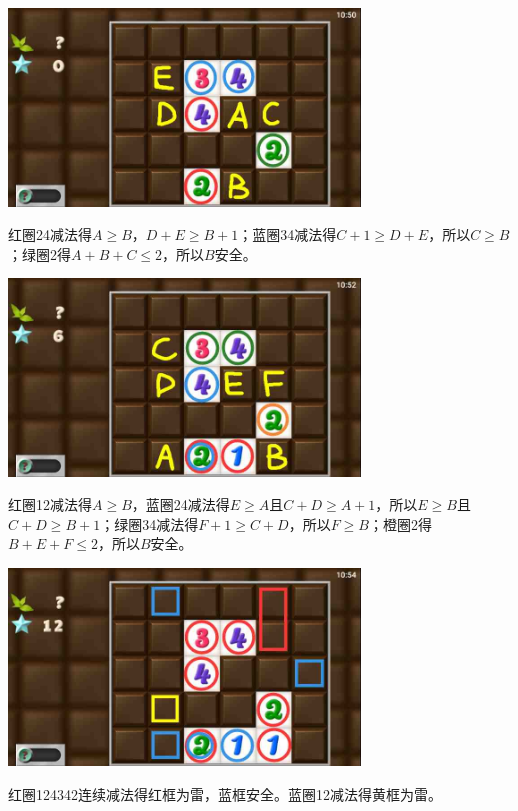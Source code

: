 \subsection{} %
\begin{center}
    \includegraphics[width=0.7\textwidth]{puzzlelow/212-1.jpg}
\end{center}
红圈24减法得$A\ge B$，$D+E\ge B+1$；蓝圈34减法得$C+1\ge D+E$，所以$C\ge B$；绿圈2得$A+B+C\le 2$，所以$B$安全。
\begin{center}
    \includegraphics[width=0.7\textwidth]{puzzlelow/212-2.jpg}
\end{center}
红圈12减法得$A\ge B$，蓝圈24减法得$E\ge A$且$C+D\ge A+1$，所以$E\ge B$且$C+D\ge B+1$；绿圈34减法得$F+1\ge C+D$，所以$F\ge B$；橙圈2得$B+E+F\le 2$，所以$B$安全。
\begin{center}
    \includegraphics[width=0.7\textwidth]{puzzlelow/212-3.jpg}
\end{center}
红圈124342连续减法得红框为雷，蓝框安全。蓝圈12减法得黄框为雷。
